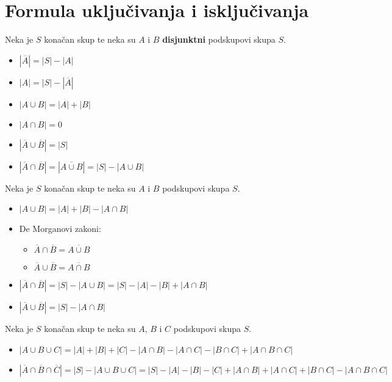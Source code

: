\section{Formula uključivanja i isključivanja}

Neka je $S$ konačan skup te neka su $A$ i $B$ \textbf{disjunktni} podskupovi skupa $S$.

\begin{itemize}
    \item $|\overline{A}| = |S| - |A|$
    \item $|A| = |S| - |\overline{A}|$
    \item $|A \cup B| = |A| + |B|$
    \item $|A \cap B| = 0$
    \item $|\overline{A} \cup \overline{B}| = |S|$
    \item $|\overline{A} \cap \overline{B}| = |\overline{A \cup B}| = |S| - |A \cup B|$
\end{itemize}

Neka je $S$ konačan skup te neka su $A$ i $B$ podskupovi skupa $S$.

\begin{itemize}
    \item $|A \cup B| = |A| + |B| - |A \cap B|$
    \item De Morganovi zakoni:
    \begin{itemize}
        \item $\overline{A} \cap \overline{B} = \overline{A \cup B}$
        \item $\overline{A} \cup \overline{B} = \overline{A \cap B}$
    \end{itemize}
    \item $|\overline{A}\cap \overline{B}| = |S| - |A \cup B| = |S| - |A| - |B| + |A \cap B|$
    \item $|\overline{A}\cup \overline{B}| = |S| - |A \cap B|$
\end{itemize}

Neka je $S$ konačan skup te neka su $A$, $B$ i $C$ podskupovi skupa $S$.

\begin{itemize}
    \item $|A \cup B \cup C| = |A| + |B| + |C| - |A \cap B| - |A\cap C| - |B \cap C| + |A\cap B \cap C|$
    \item $|\overline{A}\cap \overline{B} \cap \overline{C}| = |S| - |A \cup B \cup C| = |S| - |A| - |B| - |C| + |A \cap B| + |A \cap C| + |B \cap C| - |A \cap B \cap C|$
\end{itemize}

